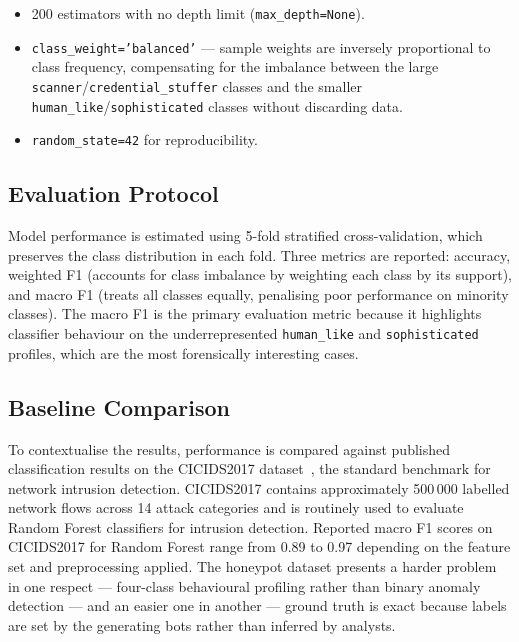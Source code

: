 \begin{itemize}
    \item 200 estimators with no depth limit (\texttt{max\_depth=None}).
    \item \texttt{class\_weight='balanced'} — sample weights are inversely
    proportional to class frequency, compensating for the imbalance between the
    large \texttt{scanner}/\texttt{credential\_stuffer} classes and the smaller
    \texttt{human\_like}/\texttt{sophisticated} classes without discarding data.
    \item \texttt{random\_state=42} for reproducibility.
\end{itemize}

\subsection{Evaluation Protocol}

Model performance is estimated using 5-fold stratified cross-validation, which
preserves the class distribution in each fold. Three metrics are reported:
accuracy, weighted F1 (accounts for class imbalance by weighting each class by
its support), and macro F1 (treats all classes equally, penalising poor
performance on minority classes). The macro F1 is the primary evaluation metric
because it highlights classifier behaviour on the underrepresented
\texttt{human\_like} and \texttt{sophisticated} profiles, which are the most
forensically interesting cases.

\subsection{Baseline Comparison}

To contextualise the results, performance is compared against published
classification results on the CICIDS2017 dataset~\cite{BCF12}, the standard
benchmark for network intrusion detection. CICIDS2017 contains approximately
500\,000 labelled network flows across 14 attack categories and is routinely
used to evaluate Random Forest classifiers for intrusion detection. Reported
macro F1 scores on CICIDS2017 for Random Forest range from 0.89 to 0.97
depending on the feature set and preprocessing applied. The honeypot dataset
presents a harder problem in one respect — four-class behavioural profiling
rather than binary anomaly detection — and an easier one in another — ground
truth is exact because labels are set by the generating bots rather than
inferred by analysts.
